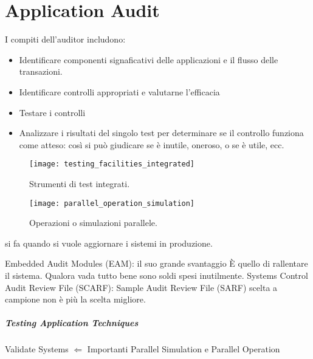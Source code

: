 \chapter{Application Audit}
\label{cs:aa}

I compiti dell'auditor includono:
\begin{itemize}
\item Identificare componenti signaficativi delle applicazioni e 
il flusso delle transazioni.
\item 
Identificare controlli appropriati e valutarne l'efficacia
\item 
Testare i controlli
\item Analizzare i risultati del singolo test per determinare se 
il controllo funziona come atteso: così si può giudicare se è inutile,
oneroso, o se è utile, ecc.
\end{itemize}

\begin{figure}[h!]
        \begin{center}
                \texttt{[image: testing\_facilities\_integrated]}
        \end{center}
        \caption{Strumenti di test integrati.}
        \label{fig:testing:facilities:integrated}
\end{figure}

\begin{figure}[h!]
        \begin{center}
                \texttt{[image: parallel\_operation\_simulation]}
        \end{center}
        \caption{Operazioni o simulazioni parallele.}
        \label{fig:testing:facilities:parallel}
\end{figure}
si fa quando si vuole aggiornare i sistemi in produzione.

Embedded Audit Modules (EAM): il suo grande svantaggio È quello di rallentare il
sistema. Qualora vada tutto bene sono soldi spesi inutilmente.
Systems Control Audit Review File (SCARF):
Sample Audit Review File (SARF) scelta a campione non è più la scelta migliore.

\paragraph{Testing Application Techniques}
Validate Systems $\Leftarrow$ Importanti Parallel Simulation e Parallel
Operation



